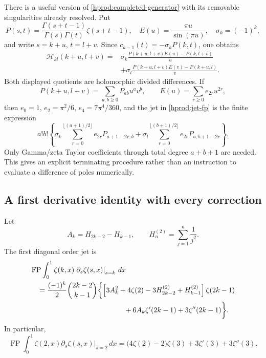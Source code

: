 \documentclass[11pt,a4paper]{article}
\numberwithin{equation}{section}
\theoremstyle{definition}
\theoremstyle{remark}
\begin{document}
There is a useful version of \eqref{hprod:completed-generator} with
its removable singularities already resolved.  Put
\[
 P(s,t)=\frac{\Gamma(s+t-1)}{\Gamma(s)\Gamma(t)}\zeta(s+t-1),
 \quad E(u)=\frac{\pi u}{\sin(\pi u)},\quad
 \sigma_k=(-1)^k,
\]
and write $s=k+u$, $t=l+v$.  Since
$c_{k-1}(t)=-\sigma_kP(k,t)$, one obtains
\begin{equation}\label{hprod:divided-differences}
 \begin{split}
 \mathscr H_{kl}(k+u,l+v)
 ={}&\sigma_k\frac{P(k+u,l+v)E(u)-P(k,l+v)}u\\
 &+\sigma_l\frac{P(k+u,l+v)E(v)-P(k+u,l)}v.
 \end{split}
\end{equation}
Both displayed quotients are holomorphic divided differences.
If
\[
 P(k+u,l+v)=\sum_{a,b\ge0}P_{ab}u^av^b,
 \qquad E(u)=\sum_{r\ge0}e_{2r}u^{2r},
\]
then $e_0=1$, $e_2=\pi^2/6$, $e_4=7\pi^4/360$, and
the jet in \eqref{hprod:jet-fp} is the finite expression
\begin{equation}\label{hprod:finite-jet-algorithm}
 a!b!\left\{
 \sigma_k\sum_{r=0}^{\lfloor(a+1)/2\rfloor}e_{2r}P_{a+1-2r,b}
 +\sigma_l\sum_{r=0}^{\lfloor(b+1)/2\rfloor}e_{2r}P_{a,b+1-2r}
 \right\}.
\end{equation}
Only Gamma/zeta Taylor coefficients through total degree $a+b+1$
are needed.  This gives an explicit terminating procedure rather than
an instruction to evaluate a difference of poles numerically.

\subsection{A first derivative identity with every correction}

Let
\[
 A_k=H_{2k-2}-H_{k-1},\qquad
 H_n^{(2)}=\sum_{j=1}^n\frac1{j^2}.
\]
The first diagonal order jet is
\begin{equation}\label{hprod:first-order-jet}
 \begin{split}
 &\operatorname{FP}\int_0^1\zeta(k,x)
     \left.\partial_s\zeta(s,x)\right|_{s=k}\,dx\\
 &\quad=\frac{(-1)^k}{2}\binom{2k-2}{k-1}
 \biggl\{
 \left[3A_k^2+4\zeta(2)-3H_{2k-2}^{(2)}+H_{k-1}^{(2)}\right]
        \zeta(2k-1)\\
 &\hspace{46mm}+6A_k\zeta'(2k-1)+3\zeta''(2k-1)
 \biggr\}.
 \end{split}
\end{equation}
In particular,
\begin{equation}\label{hprod:trigamma-order-jet}
 \operatorname{FP}\int_0^1\zeta(2,x)
     \left.\partial_s\zeta(s,x)\right|_{s=2}\,dx
 =\bigl(4\zeta(2)-2\bigr)\zeta(3)
   +3\zeta'(3)+3\zeta''(3).
\end{equation}
\end{document}
